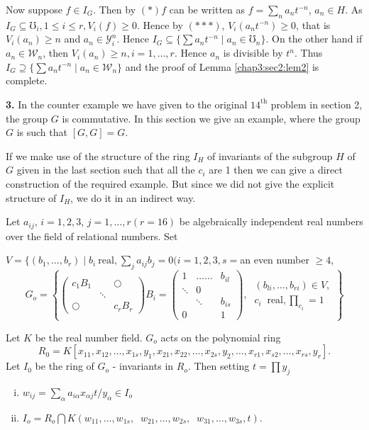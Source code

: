  Now suppose $f \in I_G$. Then by $(\ast) f$ can be written as $f =
 \sum\limits_n a_n t^{-n}$, $a_n \in H$. As $I_G \subseteq \mho_i , 1 
 \le i \le r, V_i (f)\ge 0$. Hence by $ (\ast \ast \ast )$, $V_i (a_n
 t^{-n}) \ge 0$, that is $V_i (a_n)\ge n$ and $a_n \in
 \mathscr{Y}_{i}^{n}$. Hence $I_G \subseteq \bigg\{ \sum a_n
 t^{-n}\mid a_n \in \mho_n \bigg\}$. On the other hand if $ a_n \in
 \mathscr{W}_n$, then $V_i (a_n) \ge n, i =1, \dots , r$. Hence $a_n$
 is divisible by $t^n$. Thus $ I_G \supseteq \bigg\{ \sum 
 a_n t^{-n} \mid a_n \in \mathscr{W}_n \bigg\} $ and the proof of
 Lemma \ref{chap3:sec2:lem2} is complete.


\medskip
\noindent\textbf{3.} \quad  In the counter example we have given to
the original $14^{\text{th}}$ problem in section 2, the group $G$ is
commutative. In this section we give an example, where the group $G$
is such that $[G, G] = G$.  

If we make use of the structure of the ring $I_H$ of invariants of
the subgroup $H$ of $G$ given in the last section such that all the 
$c_i$ are 1 then we can give a direct construction of the required
example. But since we did not give the explicit structure of $I_H$,
we do it in an indirect way. 

Let $ a_{ij}$, $i = 1, 2, 3$, $j = 1, \dots , r (r = 16)$ be
algebraically independent real numbers over the field of relational
numbers. Set 
 
$V= \Bigg\{ (b_1 , \dots , b_r) \mid b_i ~ \text{real,} ~ 
\sum\limits_j a_{ij} b_{j} = 0 (i = 1, 2, 3, s =$\pageoriginale an
even number $\ge 4$, 
$$   
G_o = \left \{ 
\begin{pmatrix}   
 c_1 B_1 & & \bigcirc\\ 
 & \ddots & \\ 
 \bigcirc & & c_r B_r
\end{pmatrix} 
B_i = 
\begin{pmatrix}   
 1 & \dots\dots & b_{il}\\ 
 \ddots & 0 & \\ 
 & \ddots & b_{is} \\ 
 0 & & 1 
\end{pmatrix},~ 
\begin{matrix}
 (b_{li}, \dots , b_{ri}) \in V,\\ 
 c_i ~\text{ real}, \prod_{c_i} = 1
\end{matrix} \right \}
$$ 

Let $K$ be the real number field. $G_o$ acts on the polynomial
ring
{\fontsize{10pt}{12pt}\selectfont
$$
R_0 = K [ x_{11},x_{12}, \dots , x_{1s}, y_1, x_{21}, x_{22}, \dots ,
 x_{2s}, y_2 , \dots , x_{r1}, x_{s2}, \dots , x_{rs}, y_r ].
$$}\relax
Let $I_0$ be the ring of $G_o$ - invariants in $R_o$. Then setting $
t = \prod y_j$ 
 \begin{enumerate}[(i)]
 \item $w_{ij} = \underset{\alpha} {\sum} a_{i \alpha} x_{\alpha j}
  t/y_{\alpha}\in I_o$ 

 \item $I_o = R_o \bigcap K(w_{11}, \dots, w_{1s}, \;\; w_{21}, \dots,
   w_{2s}, \;\; w_{31}, \dots , w_{3s}, t)$.  
 \end{enumerate}

